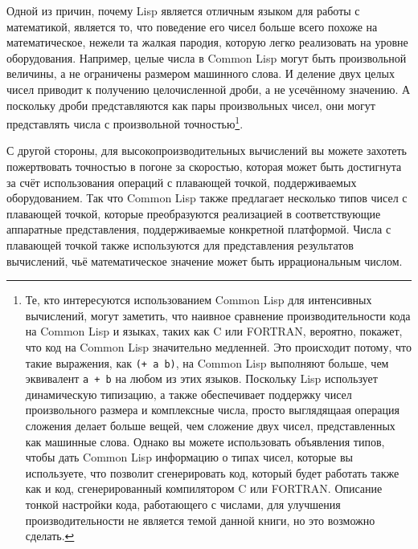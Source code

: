 Одной из причин, почему Lisp является отличным языком для работы с математикой, является
то, что поведение его чисел больше всего похоже на математическое, нежели та жалкая
пародия, которую легко реализовать на уровне оборудования.  Например, целые числа в Common
Lisp могут быть произвольной величины, а не ограничены размером машинного
слова.  И деление двух целых чисел приводит к получению
целочисленной дроби, а не усечённому значению.  А поскольку дроби представляются как пары
произвольных чисел, они могут представлять числа с произвольной точностью\footnote{Те,
  кто интересуются использованием Common Lisp для интенсивных вычислений, могут заметить,
  что наивное сравнение производительности кода на Common Lisp и языках, таких как C или
  FORTRAN, вероятно, покажет, что код на Common Lisp значительно медленней.  Это происходит
  потому, что такие выражения, как \lstinline{(+ a b)}, на Common Lisp выполняют больше, чем
  эквивалент \lstinline{a + b} на любом из этих языков.  Поскольку Lisp использует динамическую
  типизацию, а также обеспечивает поддержку чисел произвольного размера и комплексные
  числа, просто выглядящаая операция сложения делает больше вещей, чем сложение двух
  чисел, представленных как машинные слова.  Однако вы можете использовать объявления
  типов, чтобы дать Common Lisp информацию о типах чисел, которые вы используете, что
  позволит сгенерировать код, который будет работать также как и код, сгенерированный
  компилятором C или FORTRAN.  Описание тонкой настройки кода, работающего с числами, для
  улучшения производительности не является темой данной книги, но это возможно сделать.}\hspace{\footnotenegspace}.

С другой стороны, для высокопроизводительных вычислений вы можете захотеть пожертвовать
точностью в погоне за скоростью, которая может быть достигнута за счёт использования
операций с плавающей точкой, поддерживаемых оборудованием.  Так что Common Lisp также
предлагает несколько типов чисел с плавающей точкой, которые преобразуются реализацией в
соответствующие аппаратные представления, поддерживаемые конкретной
платформой.  Числа с плавающей точкой также используются для
представления результатов вычислений, чьё математическое значение может быть
иррациональным числом.

